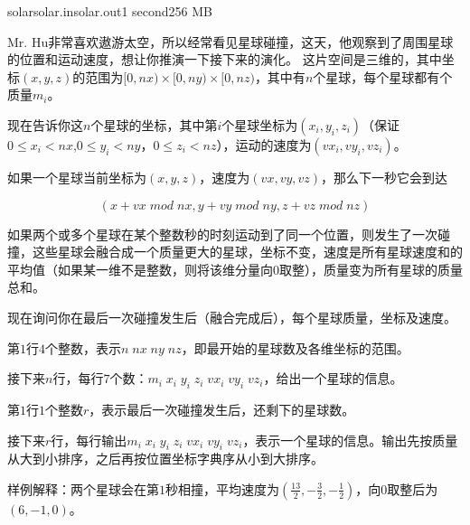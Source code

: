 \documentclass[11pt,a4paper,oneside]{article}
\begin{document}
\begin{problem}{solar}{solar.in}{solar.out}{1 second}{256 MB}

	Mr. Hu非常喜欢遨游太空，所以经常看见星球碰撞，这天，他观察到了周围星球的位置和运动速度，想让你推演一下接下来的演化。
	这片空间是三维的，其中坐标$(x,y,z)$的范围为$[0,nx)\times[0,ny)\times[0,nz)$，其中有$n$个星球，每个星球都有个质量$m_i$。
	
	现在告诉你这$n$个星球的坐标，其中第$i$个星球坐标为$(x_i,y_i,z_i)$（保证$0 \leq x_i < nx$,$0 \leq y_i < ny$，$0 \leq z_i < nz$），运动的速度为$(vx_i,vy_i,vz_i)$。
	
	如果一个星球当前坐标为$(x,y,z)$，速度为$(vx,vy,vz)$，那么下一秒它会到达
	
	$$(x+vx　\; mod \; nx,y+vy \; mod \; ny, z + vz \; mod \; nz)$$
	
	如果两个或多个星球在某个整数秒的时刻运动到了同一个位置，则发生了一次碰撞，这些星球会融合成一个质量更大的星球，坐标不变，速度是所有星球速度和的平均值（如果某一维不是整数，则将该维分量向$0$取整），质量变为所有星球的质量总和。
	
	现在询问你在最后一次碰撞发生后（融合完成后），每个星球质量，坐标及速度。

    \InputFile

	第$1$行$4$个整数，表示$n \; nx \; ny \; nz$，即最开始的星球数及各维坐标的范围。
	
	接下来$n$行，每行$7$个数：$m_i \; x_i \; y_i \; z_i \; vx_i \; vy_i \; vz_i$，给出一个星球的信息。

    \OutputFile
    
    第$1$行$1$个整数$r$，表示最后一次碰撞发生后，还剩下的星球数。
    
    接下来$r$行，每行输出$m_i \; x_i \; y_i \; z_i \; vx_i \; vy_i \; vz_i$，表示一个星球的信息。输出先按质量从大到小排序，之后再按位置坐标字典序从小到大排序。

    \Example

    \begin{example}
    \end{example}
    
    样例解释：两个星球会在第$1$秒相撞，平均速度为$(\frac{13}{2},-\frac{3}{2},-\frac{1}{2})$，向$0$取整后为$(6,-1,0)$。
    
    \begin{example}
    \end{example}
	

\end{problem}
\end{document}
